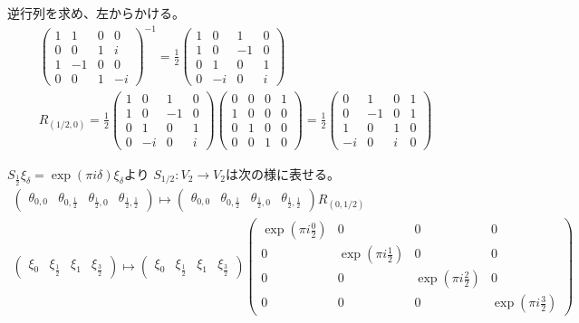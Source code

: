 \documentclass[12pt,b5paper]{ltjsarticle}
\begin{document}
\begin{description}
\begin{description}
逆行列を求め、左からかける。
\begin{gather}
  \begin{pmatrix}
  1 & 1 & 0 & 0 \\
  0 & 0 & 1 & i \\
  1 & -1 & 0 & 0 \\
  0 & 0 & 1 & -i
 \end{pmatrix}^{-1}
 =
\frac{1}{2}
\begin{pmatrix}
 1 & 0 & 1 & 0 \\
 1 & 0 & -1 & 0 \\
 0 & 1 & 0 & 1 \\
 0 & -i & 0 & i
\end{pmatrix}
\\
 R_{(1/2,0)}
  =
\frac{1}{2}
\begin{pmatrix}
 1 & 0 & 1 & 0 \\
 1 & 0 & -1 & 0 \\
 0 & 1 & 0 & 1 \\
 0 & -i & 0 & i
\end{pmatrix}
 \begin{pmatrix}
  0 & 0 & 0 & 1 \\
  1 & 0 & 0 & 0 \\
  0 & 1 & 0 & 0 \\
  0 & 0 & 1 & 0
 \end{pmatrix}
=
\frac{1}{2}
\begin{pmatrix}
0 & 1 & 0 & 1 \\
0 & -1 & 0 & 1 \\
1 & 0 & 1 & 0 \\
-i & 0 & i & 0
\end{pmatrix}
\end{gather}

$S_{\frac{1}{2}} \xi_{\delta} = \exp{(\pi i \delta)} \xi_{\delta}$より
$S_{1/2} : V_{2}\to V_{2}$は次の様に表せる。
\begin{gather}
 \begin{pmatrix}
  \theta_{0,0} & \theta_{0,\frac{1}{2}} & \theta_{\frac{1}{2},0} & \theta_{\frac{1}{2},\frac{1}{2}}
 \end{pmatrix}
\mapsto
 \begin{pmatrix}
  \theta_{0,0} & \theta_{0,\frac{1}{2}} & \theta_{\frac{1}{2},0} & \theta_{\frac{1}{2},\frac{1}{2}}
 \end{pmatrix}
R_{(0,1/2)}
 \\
 \begin{pmatrix}
  \xi_{0} & \xi_{\frac{1}{2}} & \xi_{1} & \xi_{\frac{3}{2}}
 \end{pmatrix}
\mapsto
 \begin{pmatrix}
  \xi_{0} & \xi_{\frac{1}{2}} & \xi_{1} & \xi_{\frac{3}{2}}
 \end{pmatrix}
 \begin{pmatrix}
  \exp{(\pi i \frac{0}{2})} & 0 & 0 & 0 \\
  0 & \exp{(\pi i \frac{1}{2})} & 0 & 0 \\
  0 & 0 & \exp{(\pi i \frac{2}{2})} & 0 \\
  0 & 0 & 0 & \exp{(\pi i \frac{3}{2})}
 \end{pmatrix}
\end{gather}


\end{description}
\end{description}
\end{document}

